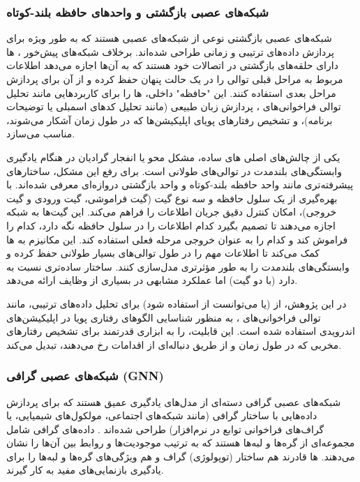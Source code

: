 \subsubsection{شبکه‌های عصبی بازگشتی و واحدهای حافظه بلند-کوتاه }
شبکه‌های عصبی بازگشتی  نوعی از شبکه‌های عصبی هستند که به طور ویژه برای پردازش داده‌های ترتیبی و زمانی طراحی شده‌اند. برخلاف شبکه‌های پیش‌خور ، ها دارای حلقه‌های بازگشتی در اتصالات خود هستند که به آن‌ها اجازه می‌دهد اطلاعات مربوط به مراحل قبلی توالی را در یک حالت پنهان  حفظ کرده و از آن برای پردازش مراحل بعدی استفاده کنند. این "حافظه" داخلی، ها را برای کاربردهایی مانند تحلیل توالی فراخوانی‌های ، پردازش زبان طبیعی (مانند تحلیل کدهای اسمبلی یا توضیحات برنامه)، و تشخیص رفتارهای پویای اپلیکیشن‌ها که در طول زمان آشکار می‌شوند، مناسب می‌سازد.

یکی از چالش‌های اصلی های ساده، مشکل محو یا انفجار گرادیان  در هنگام یادگیری وابستگی‌های بلندمدت در توالی‌های طولانی است. برای رفع این مشکل، ساختارهای پیشرفته‌تری مانند واحد حافظه بلند-کوتاه  \cite{Hochreiter1997} و واحد بازگشتی دروازه‌ای  \cite{Cho2014} معرفی شده‌اند.  با بهره‌گیری از یک سلول حافظه  و سه نوع گیت (گیت فراموشی، گیت ورودی و گیت خروجی)، امکان کنترل دقیق جریان اطلاعات را فراهم می‌کند. این گیت‌ها به شبکه اجازه می‌دهند تا تصمیم بگیرد کدام اطلاعات را در سلول حافظه نگه دارد، کدام را فراموش کند و کدام را به عنوان خروجی مرحله فعلی استفاده کند. این مکانیزم به ها کمک می‌کند تا اطلاعات مهم را در طول توالی‌های بسیار طولانی حفظ کرده و وابستگی‌های بلندمدت را به طور مؤثرتری مدل‌سازی کنند.  ساختار ساده‌تری نسبت به  دارد (با دو گیت) اما عملکرد مشابهی در بسیاری از وظایف ارائه می‌دهد.

در این پژوهش، از  (یا می‌توانست از  استفاده شود) برای تحلیل داده‌های ترتیبی، مانند توالی فراخوانی‌های ، به منظور شناسایی الگوهای رفتاری پویا در اپلیکیشن‌های اندرویدی استفاده شده است. این قابلیت،  را به ابزاری قدرتمند برای تشخیص رفتارهای مخربی که در طول زمان و از طریق دنباله‌ای از اقدامات رخ می‌دهند، تبدیل می‌کند.

\subsubsection{شبکه‌های عصبی گرافی (GNN)}
شبکه‌های عصبی گرافی  دسته‌ای از مدل‌های یادگیری عمیق هستند که برای پردازش داده‌هایی با ساختار گرافی (مانند شبکه‌های اجتماعی، مولکول‌های شیمیایی، یا گراف‌های فراخوانی توابع در نرم‌افزار) طراحی شده‌اند \cite{sanchez-lengeling2021a}. داده‌های گرافی شامل مجموعه‌ای از گره‌ها  و لبه‌ها  هستند که به ترتیب موجودیت‌ها و روابط بین آن‌ها را نشان می‌دهند. ها قادرند هم ساختار (توپولوژی) گراف و هم ویژگی‌های گره‌ها و لبه‌ها را برای یادگیری بازنمایی‌های مفید به کار گیرند.

